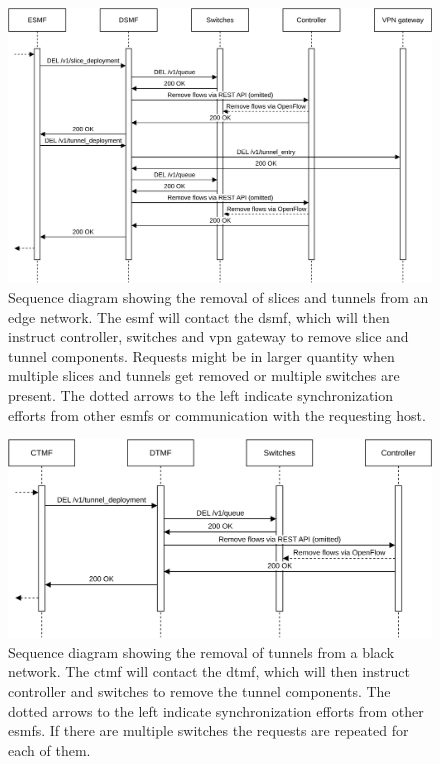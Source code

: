 \begin{figure}[H]
  \centering
  \includegraphics[width=\linewidth]{images/chapter_6/slice_removal_edge.png}
  \caption[Slice removal from an edge network]{Sequence diagram showing the removal of slices and tunnels from an edge network. The \acrshort{esmf} will contact the \acrshort{dsmf}, which will then instruct controller, switches and \acrshort{vpn} gateway to remove slice and tunnel components. Requests might be in larger quantity when multiple slices and tunnels get removed or multiple switches are present. The dotted arrows to the left indicate synchronization efforts from other \acrshort{esmf}s or communication with the requesting host.}
  \label{fig:slice_removal_edge}
\end{figure}
\begin{figure}[H]
  \centering
  \includegraphics[width=\linewidth]{images/chapter_6/slice_removal_bn.png}
  \caption[Slice removal from a black network]{Sequence diagram showing the removal of tunnels from a black network. The \acrshort{ctmf} will contact the \acrshort{dtmf}, which will then instruct controller and switches to remove the tunnel components. The dotted arrows to the left indicate synchronization efforts from other \acrshort{esmf}s. If there are multiple switches the requests are repeated for each of them.}
  \label{fig:slice_removal_bn}
\end{figure}

